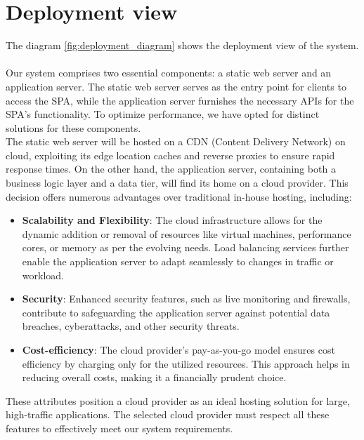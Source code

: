 \section{Deployment view}
The diagram \ref{fig:deployment_diagram} shows the deployment view of the system.\\\\
Our system comprises two essential components: a static web server and an application server. The static web server serves as the entry point for clients to access the SPA, while the application server furnishes the necessary APIs for the SPA's functionality. To optimize performance, we have opted for distinct solutions for these components.\\
The static web server will be hosted on a CDN (Content Delivery Network) on cloud, exploiting its edge location caches and reverse proxies to ensure rapid response times. On the other hand, the application server, containing both a business logic layer and a data tier, will find its home on a cloud provider. This decision offers numerous advantages over traditional in-house hosting, including:
\begin{itemize}
    \item \textbf{Scalability and Flexibility}: The cloud infrastructure allows for the dynamic addition or removal of resources like virtual machines, performance cores, or memory as per the evolving needs. Load balancing services further enable the application server to adapt seamlessly to changes in traffic or workload.
    \item \textbf{Security}: Enhanced security features, such as live monitoring and firewalls, contribute to safeguarding the application server against potential data breaches, cyberattacks, and other security threats.
    \item \textbf{Cost-efficiency}: The cloud provider's pay-as-you-go model ensures cost efficiency by charging only for the utilized resources. This approach helps in reducing overall costs, making it a financially prudent choice.
\end{itemize}
These attributes position a cloud provider as an ideal hosting solution for large, high-traffic applications. The selected cloud provider must respect all these features to effectively meet our system requirements.\\

